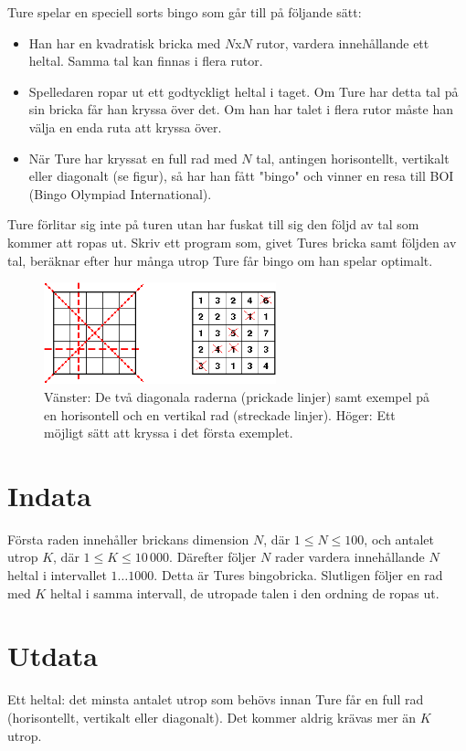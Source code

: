 
Ture spelar en speciell sorts bingo som går till på följande sätt:
\begin{itemize}
\item Han har en kvadratisk bricka med $N$x$N$ rutor, vardera innehållande ett heltal. Samma tal kan finnas i flera rutor.
\item Spelledaren ropar ut ett godtyckligt heltal i taget. Om Ture har detta tal på sin bricka får han kryssa över det. Om han har talet i flera rutor måste han välja en enda ruta att kryssa över.
\item När Ture har kryssat en full rad med $N$ tal, antingen horisontellt, vertikalt eller diagonalt (se figur), så har han fått "bingo" och vinner en resa till BOI (Bingo Olympiad International).
\end{itemize}

Ture förlitar sig inte på turen utan har fuskat till sig den följd av tal som kommer att ropas ut. Skriv ett program som, givet Tures bricka samt följden av tal, beräknar efter hur många utrop Ture får bingo om han spelar optimalt.

\begin{figure}[!h]
\begin{center}
\includegraphics[width=0.6\textwidth]{bingo.png}
\end{center}
\caption{Vänster: De två diagonala raderna (prickade linjer) samt
  exempel på en horisontell och en vertikal rad (streckade
  linjer). Höger: Ett möjligt sätt att kryssa i det första exemplet.}
\end{figure}



\section*{Indata}
 
Första raden innehåller brickans dimension $N$, där $1\leq N \leq
100$, och antalet utrop $K$, där $1 \leq K \leq 10\,000$. Därefter följer $N$ rader vardera innehållande $N$ heltal i intervallet $1\ldots 1000$. Detta är Tures bingobricka. Slutligen följer en rad med $K$ heltal i samma intervall, de utropade talen i den ordning de ropas ut.

\section*{Utdata}

Ett heltal: det minsta antalet utrop som behövs innan Ture får en full rad (horisontellt, vertikalt eller diagonalt). Det kommer aldrig krävas mer än $K$ utrop.




